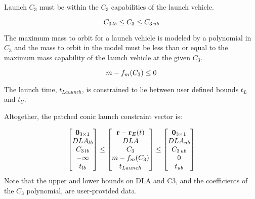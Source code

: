 \noindent Launch $C_3$ must be within the $C_3$ capabilities of the launch vehicle.

\begin{equation}
    C_{3\,lb} \le C_3 \le C_{3\,ub} \\
 \end{equation}

\noindent The maximum mass to orbit for a launch vehicle is modeled by a polynomial in $C_3$ and the mass to orbit in the model must be less than or equal to the maximum mass capability of the launch vehicle at the given $C_3$.

 \begin{equation}
  m - f_m(C_3) \leq 0 \\
 \end{equation}

\noindent The launch time, $t_{Lauunch}$, is constrained to lie between user defined bounds $t_L$ and $t_U$.

 Altogether, the patched conic launch constraint vector is:

\begin{equation}
\begin{bmatrix}
   \mathbf{0}_{3 \times 1} \\
   DLA_{lb} \\
   C_{3\,lb} \\
   -\infty \\
   t_{lb} \\
   \end{bmatrix}
\leq
\begin{bmatrix}
  \mathbf{r} - \mathbf{r}_E(t)\\
   DLA \\
   C_3 \\
   m - f_m(C_3)   \\
   t_{Launch}\\
\end{bmatrix}
\leq
\begin{bmatrix}
   \mathbf{0}_{3 \times 1} \\
   DLA_{ub} \\
   C_{3\,ub} \\
   0\\
   t_{ub} \\
   \end{bmatrix}
\end{equation}
%
Note that the upper and lower bounds on DLA and C3, and the coefficients of the $C_3$ polynomial, are user-provided data.

